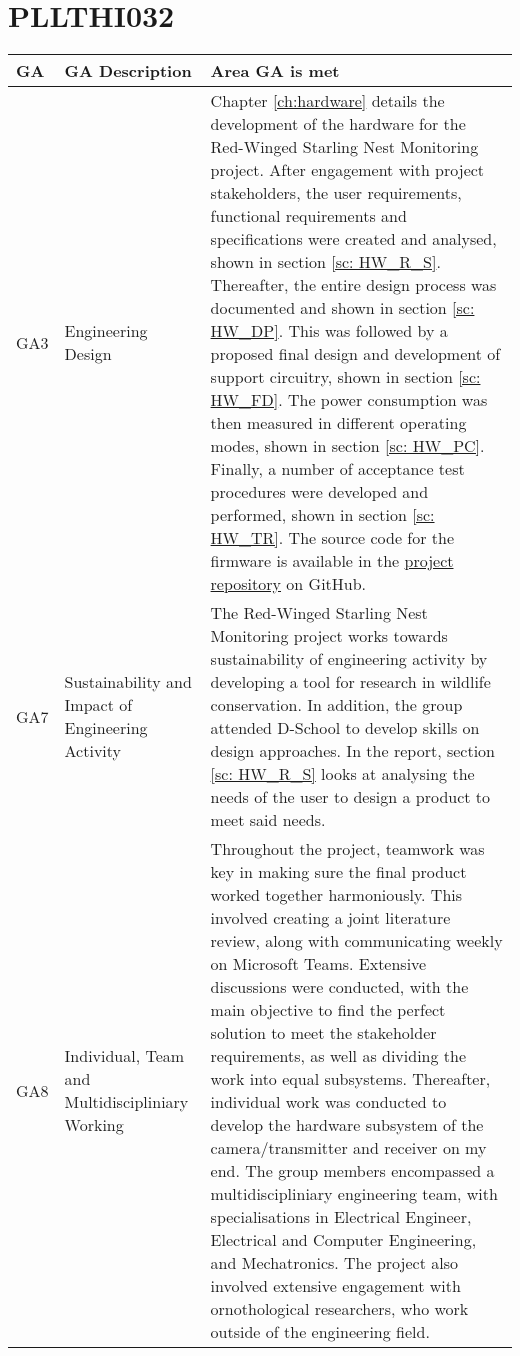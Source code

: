 \documentclass[class=report,11pt,crop=false]{standalone}
\begin{document}
\section{PLLTHI032}

\centering
\begin{tabularx}{\textwidth}{|p{} p{} X|}

    \hline
    \textbf{GA} & \textbf{GA Description} & \textbf{Area GA is met} \\ \hline

    GA3 & Engineering Design & Chapter \ref{ch:hardware} details the development of the hardware for the Red-Winged Starling Nest Monitoring project. After engagement with project stakeholders, the user requirements, functional requirements and specifications were created and analysed, shown in section \ref{sc: HW_R_S}. Thereafter, the entire design process was documented and shown in section \ref{sc: HW_DP}. This was followed by a proposed final design and development of support circuitry, shown in section \ref{sc: HW_FD}. The power consumption was then measured in different operating modes, shown in section \ref{sc: HW_PC}. Finally, a number of acceptance test procedures were developed and performed, shown in section \ref{sc: HW_TR}. The source code for the firmware is available in the \href{https://github.com/rothdu/EEE4113F-Group13-2024}{project repository} on GitHub.   \\ \hline

    GA7 & Sustainability and Impact of Engineering Activity & The Red-Winged Starling Nest Monitoring project works towards sustainability of engineering activity by developing a tool for research in wildlife conservation.  In addition, the group attended D-School to develop skills on design approaches. In the report, section \ref{sc: HW_R_S} looks at analysing the needs of the user to design a product to meet said needs. \\ \hline

    GA8 & Individual, Team and Multidiscipliniary Working & Throughout the project, teamwork was key in making sure the final product worked together harmoniously. This involved creating a joint literature review, along with communicating weekly on Microsoft Teams. Extensive discussions were conducted, with the main objective to find the perfect solution to meet the stakeholder requirements, as well as dividing the work into equal subsystems. Thereafter, individual work was conducted to develop the hardware subsystem of the camera/transmitter and receiver on my end. The group members encompassed a multidiscipliniary engineering team, with specialisations in Electrical Engineer, Electrical and Computer Engineering, and Mechatronics. The project also involved extensive engagement with ornothological researchers, who work outside of the engineering field. \\ \hline


\end{tabularx}
\end{document}
